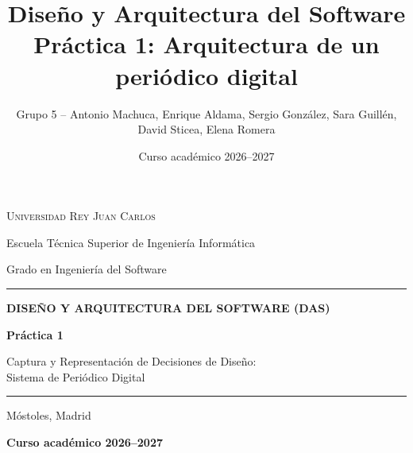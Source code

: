\documentclass[12pt,a4paper,oneside]{report}
\title{Diseño y Arquitectura del Software\\[0.5em]
\large Práctica 1: Arquitectura de un periódico digital}
\author{Grupo 5 -- Antonio Machuca, Enrique Aldama, Sergio González, Sara Guillén, David Sticea, Elena Romera}
\date{Curso académico 2026--2027}
\begin{document}
\begin{titlepage}
    \centering
    \vspace*{0.1cm}
    \par
    \vspace{0.45cm}
    {\scshape\large Universidad Rey Juan Carlos\par}
    \vspace{0.1cm}
    {\color{urjcslate}\normalsize Escuela Técnica Superior de Ingeniería Informática\par}
    {\color{urjcslate}\small Grado en Ingeniería del Software\par}

    \vspace{0.85cm}
    {\color{urjcred}\rule{\textwidth}{1.6pt}}\par
    \vspace{0.45cm}
    {\large\bfseries\color{urjcslate} DISEÑO Y ARQUITECTURA DEL SOFTWARE (DAS)\par}
    \vspace{0.3cm}
    {\Huge\bfseries Práctica 1\par}
    \vspace{0.2cm}
    {\Large Captura y Representación de Decisiones de Diseño:\\[0.15em]
    Sistema de Periódico Digital\par}
    \vspace{0.45cm}
    {\color{urjcred}\rule{\textwidth}{0.7pt}}\par

    \vfill
    {\color{urjcslate}\normalsize Móstoles, Madrid\par}
    \vspace{0.12cm}
    {\bfseries Curso académico 2026--2027\par}
\end{titlepage}

\tableofcontents
\clearpage
{}
{}
\listoffigures
\clearpage
{}
{}
\listoftables
\clearpage
{}





% 
% 
\end{document}

